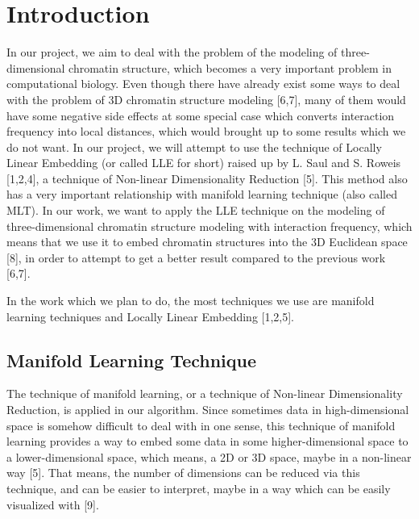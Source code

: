 \documentclass[12pt]{article} %
\begin{document}

\tableofcontents %

\newpage %


\section{Introduction} %
In our project, we aim to deal with the problem of the modeling of three-dimensional chromatin structure, which becomes a very important problem in computational biology. Even though there have already exist some ways to deal with the problem of 3D chromatin structure modeling [6,7], many of them would have some negative side effects at some special case which converts interaction frequency into local distances, which would brought up to some results which we do not want. In our project, we will attempt to use the technique of Locally Linear Embedding (or called LLE for short) raised up by L. Saul and S. Roweis [1,2,4], a technique of Non-linear Dimensionality Reduction [5]. This method also has a very important relationship with manifold learning technique (also called MLT). In our work, we want to apply the LLE technique on the modeling of three-dimensional chromatin structure modeling with interaction frequency, which means that we use it to embed chromatin structures into the 3D Euclidean space [8], in order to attempt to get a better result compared to the previous work [6,7].

In the work which we plan to do, the most techniques we use are manifold learning techniques and Locally Linear Embedding [1,2,5].


\subsection{Manifold Learning Technique} %
The technique of manifold learning, or a technique of Non-linear Dimensionality Reduction, is applied in our algorithm. Since sometimes data in high-dimensional space is somehow difficult to deal with in one sense, this technique of manifold learning provides a way to embed some data in some higher-dimensional space to a lower-dimensional space, which means, a 2D or 3D space, maybe in a non-linear way [5]. That means, the number of dimensions can be reduced via this technique, and can be easier to interpret, maybe in a way which can be easily visualized with [9].
\end{document}
